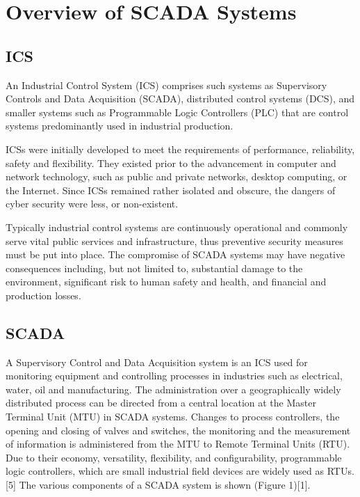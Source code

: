 \documentclass[11pt,]{article}
\begin{document}
\newpage

\section{Overview of SCADA Systems}\label{overview-of-scada-systems}

\subsection{ICS}\label{ics}

An Industrial Control System (ICS) comprises such systems as Supervisory
Controls and Data Acquisition (SCADA), distributed control systems
(DCS), and smaller systems such as Programmable Logic Controllers (PLC)
that are control systems predominantly used in industrial production.

ICSs were initially developed to meet the requirements of performance,
reliability, safety and flexibility. They existed prior to the
advancement in computer and network technology, such as public and
private networks, desktop computing, or the Internet. Since ICSs
remained rather isolated and obscure, the dangers of cyber security were
less, or non-existent.

Typically industrial control systems are continuously operational and
commonly serve vital public services and infrastructure, thus preventive
security measures must be put into place. The compromise of SCADA
systems may have negative consequences including, but not limited to,
substantial damage to the environment, significant risk to human safety
and health, and financial and production losses.

\subsection{SCADA}\label{scada}

A Supervisory Control and Data Acquisition system is an ICS used for
monitoring equipment and controlling processes in industries such as
electrical, water, oil and manufacturing. The administration over a
geographically widely distributed process can be directed from a central
location at the Master Terminal Unit (MTU) in SCADA systems. Changes to
process controllers, the opening and closing of valves and switches, the
monitoring and the measurement of information is administered from the
MTU to Remote Terminal Units (RTU). Due to their economy, versatility,
flexibility, and configurability, programmable logic controllers, which
are small industrial field devices are widely used as RTUs.{[}5{]} The
various components of a SCADA system is shown (Figure 1){[}1{]}.
\end{document}
